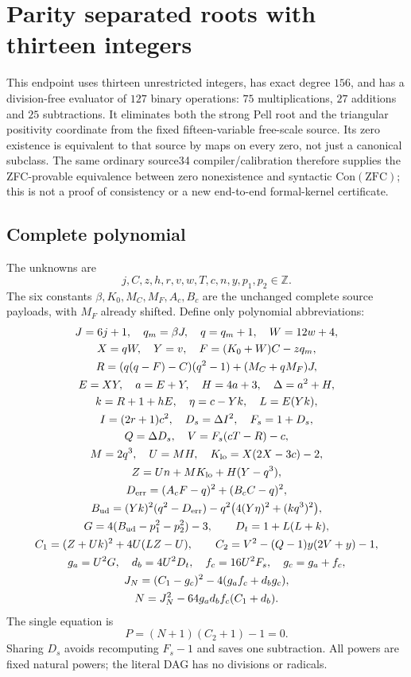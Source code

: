 \section{Parity separated roots with thirteen integers}
\label{sec:parity-three-root13}
This endpoint uses thirteen unrestricted integers, has exact degree $156$, and
has a division-free evaluator of $127$ binary operations: $75$ multiplications,
$27$ additions and $25$ subtractions. It eliminates both the strong Pell root and
the triangular positivity coordinate from the fixed fifteen-variable free-scale
source. Its zero existence is equivalent to that source by maps on every zero,
not just a canonical subclass. The same ordinary source34 compiler/calibration
therefore supplies the ZFC-provable equivalence between zero nonexistence and
syntactic $\mathrm{Con}(\mathrm{ZFC})$; this is not a proof of consistency or a new
end-to-end formal-kernel certificate.

\subsection{Complete polynomial}
The unknowns are
\[
 j,C,z,h,r,v,w,T,c,n,y,p_1,p_2\in\mathbb Z.
\]
The six constants $\beta,K_0,M_C,M_F,A_c,B_c$ are the unchanged complete source
payloads, with $M_F$ already shifted. Define only polynomial abbreviations:
\begin{gather*}
 J=6j+1,\quad q_m=\beta J,\quad q=q_m+1,\quad W=12w+4,\\
 X=qW,\quad Y=v,\quad F=(K_0+W)C-zq_m,\\
 R=(q(q-F)-C)(q^2-1)+(M_C+qM_F)J,\\
 E=XY,\quad a=E+Y,\quad H=4a+3,\quad\Delta=a^2+H,\\
 k=R+1+hE,\quad \eta=c-Yk,\quad L=E(Yk),\\
 I=(2r+1)c^2,\quad D_s=\Delta I^2,\quad F_s=1+D_s,\\
 Q=\Delta D_s,\quad V=F_s(cT-R)-c,\\
 M=2q^3,\quad U=MH,\quad K_{\rm lo}=X(2X-3c)-2,\\
 Z=Un+MK_{\rm lo}+H(Y-q^3),\\
 D_{\rm err}=(A_cF-q)^2+(B_cC-q)^2,\\
 B_{\rm ud}=(Yk)^2(q^2-D_{\rm err})
       -q^2\bigl(4(Y\eta)^2+(kq^3)^2\bigr),\\
 G=4(B_{\rm ud}-p_1^2-p_2^2)-3,\qquad D_t=1+L(L+k),\\
 C_1=(Z+Uk)^2+4U(LZ-U),\qquad
 C_2=V^2-(Q-1)y(2V+y)-1,\\
 g_a=U^2G,\quad d_b=4U^2D_t,\quad f_c=16U^2F_s,\quad g_c=g_a+f_c,\\
 J_N=(C_1-g_c)^2-4(g_af_c+d_bg_c),\\
 N=J_N^2-64g_ad_bf_c(C_1+d_b).
\end{gather*}
The single equation is
\[
 \boxed{P=(N+1)(C_2+1)-1=0.}
\]
Sharing $D_s$ avoids recomputing $F_s-1$ and saves one subtraction. All powers
are fixed natural powers; the literal DAG has no divisions or radicals.

